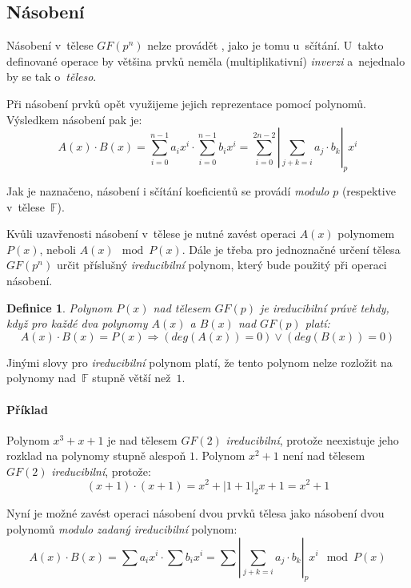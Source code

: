 \documentclass[thesis=M,czech,hidelinks]{FITthesis}[2012/06/26]
\newcommand{\0}{{\textcolor[gray]{0.75}{0}}}
\newtheorem{definice}{Definice}
\begin{document}
\subsection{Násobení}

Násobení v~tělese $GF(p^n)$ nelze provádět , jako je tomu
u~sčítání. U~takto definované operace by většina prvků neměla (multiplikativní)
\emph{inverzi} a~nejednalo by se tak o~\emph{těleso}.

Při násobení prvků opět využijeme jejich reprezentace pomocí polynomů.
Výsledkem násobení pak je:
$$
    A(x) \cdot B(x) = \sum_{i=0}^{n-1} a_i x^i \cdot \sum_{i=0}^{n-1} b_i x^i =
    \sum_{i=0}^{2n-2} \left|\sum_{j+k=i} a_j \cdot b_k\right|_p x^i
$$

Jak je naznačeno, násobení i sčítání koeficientů se provádí \emph{modulo} $p$
(respektive v~tělese~$\mathbb{F}$).

Kvůli uzavřenosti násobení v~tělese je nutné zavést operaci  $A(x)$ polynomem $P(x)$, neboli $A(x) \mod P(x)$. Dále je třeba pro
jednoznačné určení tělesa $GF(p^n)$ určit příslušný  \emph{ireducibilní}
polynom, který bude použitý při operaci násobení.

\begin{definice}
    Polynom $P(x)$ nad tělesem $GF(p)$ je \emph{ireducibilní} právě tehdy, když
    pro každé dva polynomy $A(x)$ a $B(x)$ nad $GF(p)$ platí:
    $$
        A(x) \cdot B(x) = P(x) \Rightarrow \left( deg(A(x)) = 0 \right) \lor
        \left( deg(B(x)) = 0 \right)
    $$
\end{definice}

Jinými slovy pro \emph{ireducibilní} polynom platí, že tento polynom nelze
rozložit na polynomy nad~$\mathbb{F}$ stupně větší než~$1$.

\paragraph{Příklad} Polynom $x^3+x+1$ je nad tělesem $GF(2)$
\emph{ireducibilní}, protože neexistuje jeho rozklad na polynomy stupně alespoň
$1$. Polynom $x^2+1$ není nad tělesem $GF(2)$ \emph{ireducibilní}, protože:
$$ (x+1)\cdot(x+1) = x^2 + \left|1+1\right|_2x + 1 = x^2+1 $$

Nyní je možné zavést operaci násobení dvou prvků tělesa jako násobení dvou
polynomů \emph{modulo} \emph{zadaný ireducibilní} polynom:
$$
    A(x) \cdot B(x) = \sum a_i x^i \cdot \sum b_i x^i =
    \sum \left|\sum_{j+k=i} a_j \cdot b_k\right|_p x^i \mod P(x)
$$
\end{document}
